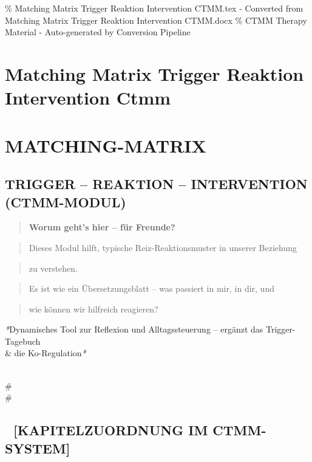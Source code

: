 \% Matching Matrix Trigger Reaktion Intervention CTMM.tex - Converted from Matching Matrix Trigger Reaktion Intervention CTMM.docx
\% CTMM Therapy Material - Auto-generated by Conversion Pipeline

\section{Matching Matrix Trigger Reaktion Intervention Ctmm}
\label{sec:matching-matrix-trigger-reaktion-intervention-ctmm}

\section{\textcolor{ctmmBlue}{} \textbf{MATCHING-MATRIX}}
\subsection{\textbf{TRIGGER -- REAKTION -- INTERVENTION (\textcolor{ctmmBlue}{CTMM}-MODUL)}}

\begin{quote}
\textcolor{ctmmPurple}{} \textbf{Worum geht's hier -- für Freunde?}\
\end{quote}
\begin{quote}
Dieses Modul hilft, typische Reiz-Reaktionsmuster in unserer Beziehung
\end{quote}
\begin{quote}
zu verstehen.\
\end{quote}
\begin{quote}
Es ist wie ein Übersetzungsblatt -- was passiert in mir, in dir, und
\end{quote}
\begin{quote}
wie können wir hilfreich reagieren?
\end{quote}

\textcolor{ctmmBlue}{} \textit{*}Dynamisches Tool zur Reflexion und Alltagssteuerung -- ergänzt das
\textcolor{ctmmRed}{Trigger}-Tagebuch \\& die Ko-Regulation\textit{*}

\\#\\#

\subsection{📘 \textbf{[KAPITELZUORDNUNG IM \textcolor{ctmmBlue}{CTMM}-SYSTEM]}}

